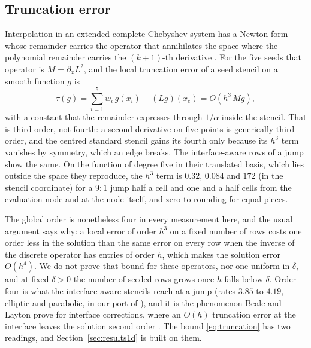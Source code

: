 \documentclass[11pt]{amsart}
\theoremstyle{definition}
\theoremstyle{remark}
\newcommand{\px}{\partial_x}
\begin{document}
\subsection{Truncation error}
\label{sec:truncation}
Interpolation in an extended complete Chebyshev system has a Newton form
whose remainder carries the operator that annihilates the space where the
polynomial remainder carries the $(k + 1)$-th derivative
\cite{Muhlbach1973}. For the five seeds that operator is $M = \px L^2$, and
the local truncation error of a seed stencil on a smooth function $g$ is
\begin{equation}
  \label{eq:truncation}
  \tau(g) = \sum_{i=1}^{5} w_i\, g(x_i) - (L g)(x_e) = O(h^3\, M g),
\end{equation}
with a constant that the remainder expresses through $1/\alpha$ inside the
stencil. That is third order, not fourth: a second derivative on five
points is generically third order, and the centred standard stencil gains
its fourth only because its $h^3$ term vanishes by symmetry, which an edge
breaks. The interface-aware rows of a jump show the same. On the function
of degree five in their translated basis, which lies outside the space they
reproduce, the $h^3$ term is $0.32$, $0.084$ and $172$ (in the stencil
coordinate) for a $9 : 1$ jump half a cell and one and a half cells from
the evaluation node and at the node itself, and zero to rounding for equal
pieces.

The global order is nonetheless four in every measurement here, and the
usual argument says why: a local error of order $h^3$ on a fixed number of
rows costs one order less in the solution than the same error on every row
when the inverse of the discrete operator has entries of order $h$, which
makes the solution error $O(h^4)$. We do not prove that bound for these
operators, nor one uniform in $\delta$, and at fixed $\delta > 0$ the number
of seeded rows grows once $h$ falls below $\delta$. Order four is what the
interface-aware stencils reach at a jump (rates $3.85$ to $4.19$,
elliptic and parabolic, in our port of \cite{Martin2016}), and it is the
phenomenon Beale and Layton prove for interface corrections, where an
$O(h)$ truncation error at the interface leaves the solution second order
\cite{BealeLayton2006}. The bound \eqref{eq:truncation} has two readings,
and Section~\ref{sec:results1d} is built on them.
\end{document}
